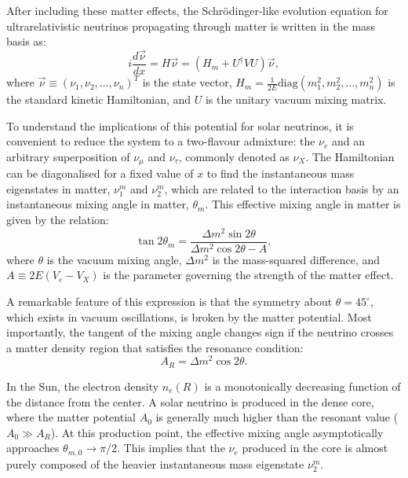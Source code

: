 After including these matter effects, the Schrödinger-like evolution equation for ultrarelativistic neutrinos propagating through matter is written in the mass basis as:
\begin{equation}
    \label{eq:evolution_equation}
    i\frac{d\vec{\nu}}{dx} = H\vec{\nu} = \left( H_m + U^{\dagger} V U \right) \vec{\nu},
\end{equation}
where $\vec{\nu} \equiv (\nu_1, \nu_2, \dots, \nu_n)^T$ is the state vector, $H_m = \frac{1}{2E} \text{diag}(m_1^2, m_2^2, \dots, m_n^2)$ is the standard kinetic Hamiltonian, and $U$ is the unitary vacuum mixing matrix.

To understand the implications of this potential for solar neutrinos, it is convenient to reduce the system to a two-flavour admixture: the $\nu_e$ and an arbitrary superposition of $\nu_\mu$ and $\nu_\tau$, commonly denoted as $\nu_X$. The Hamiltonian can be diagonalised for a fixed value of $x$ to find the instantaneous mass eigenstates in matter, $\nu_1^m$ and $\nu_2^m$, which are related to the interaction basis by an instantaneous mixing angle in matter, $\theta_m$. This effective mixing angle in matter is given by the relation:
\begin{equation}
    \label{eq:theta_matter}
    \tan 2\theta_m = \frac{\Delta m^2 \sin 2\theta}{\Delta m^2 \cos 2\theta - A},
\end{equation}
where $\theta$ is the vacuum mixing angle, $\Delta m^2$ is the mass-squared difference, and $A \equiv 2E(V_e - V_X)$ is the parameter governing the strength of the matter effect. 

A remarkable feature of this expression is that the symmetry about $\theta = 45^\circ$, which exists in vacuum oscillations, is broken by the matter potential. Most importantly, the tangent of the mixing angle changes sign if the neutrino crosses a matter density region that satisfies the resonance condition:
\begin{equation}
    \label{eq:resonance_condition}
    A_R = \Delta m^2 \cos 2\theta.
\end{equation}

In the Sun, the electron density $n_e(R)$ is a monotonically decreasing function of the distance from the center. A solar neutrino is produced in the dense core, where the matter potential $A_0$ is generally much higher than the resonant value ($A_0 \gg A_R$). At this production point, the effective mixing angle asymptotically approaches $\theta_{m,0} \to \pi/2$. This implies that the $\nu_e$ produced in the core is almost purely composed of the heavier instantaneous mass eigenstate $\nu_2^m$.

